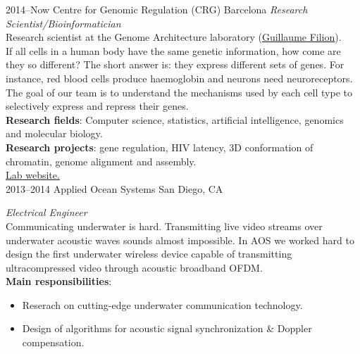 \documentclass[]{friggeri-cv} %
\begin{document}
\begin{entrylist}


\entry
{2014--Now}
{Centre for Genomic Regulation (CRG)}
{Barcelona}
{%
\emph{Research Scientist/Bioinformatician} \\
Research scientist at the Genome Architecture laboratory
(\href{http://blog.thegrandlocus.com/}{Guillaume Filion}). \\
If all cells in a human body have the same genetic information, how come are
they so different? The short answer is:  they express different sets of genes.
For instance, red blood cells produce haemoglobin and neurons need neuroreceptors.
The goal of our team is to understand the mechanisms used by each cell type to
selectively express and repress their genes.\\
{\bf Research fields}: Computer science, statistics, artificial intelligence,
genomics and molecular biology. \\
{\bf Research projects}: gene regulation, HIV latency, 3D conformation of
chromatin, genome alignment and assembly.\\
\href{http://www.genomearchitecture.com}{{\FA \faExternalLink} Lab website.}
}\\


\entry
{2013--2014}
{Applied Ocean Systems}
{San Diego, CA}
{%
\emph{Electrical Engineer} \\
Communicating underwater is hard. Transmitting live video streams over underwater
acoustic waves sounds almost impossible. In AOS we worked hard to design the
first underwater wireless device capable of transmitting ultracompressed video
through acoustic broadband OFDM. \\
{\bf Main responsibilities}:
  \begin{itemize}
    \item Reserach on cutting-edge underwater communication technology.
    \item Design of algorithms for acoustic signal synchronization \& Doppler compensation.
  \end{itemize}
}\\



\end{entrylist}
\end{document}
